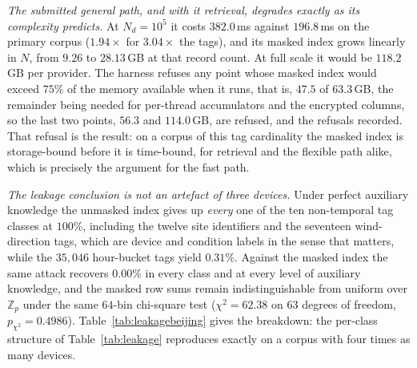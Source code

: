 \documentclass[a4paper,fleqn]{cas-dc}
\begin{document}
\emph{The submitted general path, and with it retrieval, degrades exactly as
its complexity predicts.} At
$N_d=10^5$ it costs $382.0$\,ms against $196.8$\,ms on the primary corpus
($1.94\times$ for $3.04\times$ the tags), and its masked index grows linearly
in $N$, from $9.26$ to $28.13$\,GB at that record count. At full scale it
would be $118.2$\,GB per provider. The harness refuses any point whose masked
index would exceed $75\%$ of the memory available when it runs, that is,
$47.5$ of $63.3$\,GB, the remainder being needed for per-thread accumulators
and the encrypted columns, so the last two points, $56.3$ and $114.0$\,GB, are
refused, and the refusals recorded. That refusal is the result: on a
corpus of this tag cardinality the masked index is storage-bound before it is
time-bound, for retrieval and the flexible path alike, which is precisely the
argument for the fast path.

\emph{The leakage conclusion is not an artefact of three devices.} Under
perfect auxiliary knowledge the unmasked index gives up \emph{every} one of
the ten non-temporal tag classes at $100\%$, including the twelve site
identifiers and the seventeen wind-direction tags, which are device and
condition labels in the sense that matters, while the $35{,}046$ hour-bucket
tags yield $0.31\%$. Against the masked index the same attack recovers
$0.00\%$ in every class and at every level of auxiliary knowledge, and the
masked row sums remain indistinguishable from uniform over $\mathbb{Z}_p$
under the same $64$-bin chi-square test ($\chi^2=62.38$ on $63$ degrees of
freedom, $p_{\chi^2}=0.4986$). Table~\ref{tab:leakagebeijing} gives the
breakdown: the per-class structure of Table~\ref{tab:leakage} reproduces
exactly on a corpus with four times as many devices.
\end{document}
